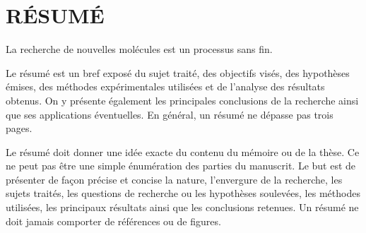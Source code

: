 \documentclass[../Document.tex]{subfiles}
\begin{document}
%
\chapter*{RÉSUMÉ}\thispagestyle{headings}

La recherche de nouvelles molécules est un processus sans fin. 

Le résumé est un bref exposé du sujet traité, des objectifs visés, des hypothèses émises, des méthodes expérimentales utilisées et de l'analyse des résultats obtenus. On y présente également les principales conclusions de la recherche ainsi que ses applications éventuelles. En général, un résumé ne dépasse pas trois pages.

Le résumé doit donner une idée exacte du contenu du mémoire ou de la thèse. Ce ne peut pas être une simple énumération des parties du manuscrit. Le but est de présenter de façon précise et concise la nature, l’envergure de la recherche, les sujets traités, les questions de recherche ou les hypothèses soulevées, les méthodes utilisées, les principaux résultats ainsi que les conclusions retenues. Un résumé ne doit jamais comporter de références ou de figures. 
\end{document}
